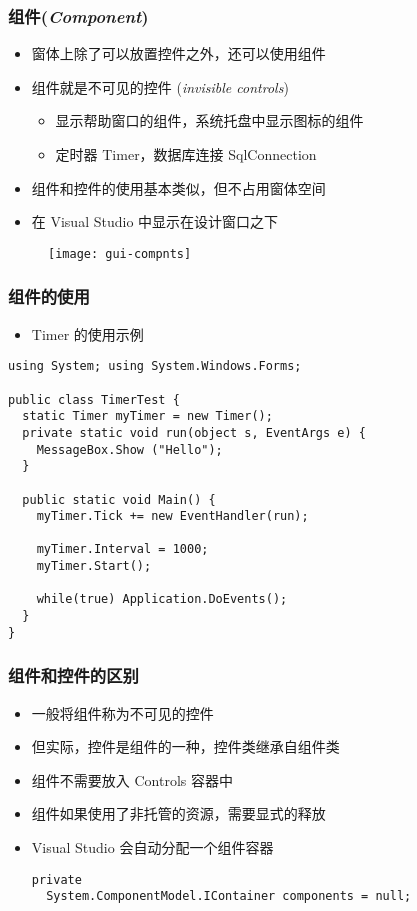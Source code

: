 \begin{frame}
\frametitle{组件(\textit{Component})}
\begin{itemize}
\item 窗体上除了可以放置控件之外，还可以使用组件
\item 组件就是不可见的控件 (\textit{invisible controls})
\begin{itemize}
\item 显示帮助窗口的组件，系统托盘中显示图标的组件
\item 定时器 Timer，数据库连接 SqlConnection
\end{itemize}
\item 组件和控件的使用基本类似，但不占用窗体空间
\item 在 Visual Studio 中显示在设计窗口之下
\end{itemize}
\begin{figure}[htbp]
  \centering
  \texttt{[image: gui-compnts]}
\end{figure}
\end{frame}

\begin{frame}[fragile]
\frametitle{组件的使用}
\begin{itemize}
\item Timer 的使用示例
\end{itemize}
\begin{lstlisting}
using System; using System.Windows.Forms;

public class TimerTest {
  static Timer myTimer = new Timer();
  private static void run(object s, EventArgs e) {
    MessageBox.Show ("Hello");
  }
 
  public static void Main() {
    myTimer.Tick += new EventHandler(run);
 
    myTimer.Interval = 1000;
    myTimer.Start();
 
    while(true) Application.DoEvents();
  }
}
\end{lstlisting}
\end{frame}

\begin{frame}[fragile]
\frametitle{组件和控件的区别}
\begin{itemize}
\setlength{\itemsep}{6pt plus 1pt}
\item 一般将组件称为不可见的控件
\item 但实际，控件是组件的一种，控件类继承自组件类
\item 组件不需要放入 Controls 容器中
\item 组件如果使用了非托管的资源，需要显式的释放
\item Visual Studio 会自动分配一个组件容器
\begin{lstlisting}
private
  System.ComponentModel.IContainer components = null;
\end{lstlisting}
\end{itemize}
\end{frame}

